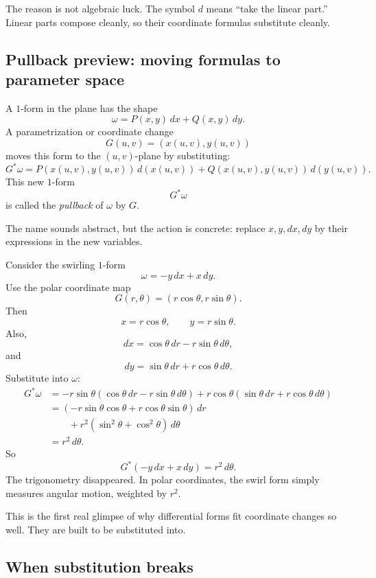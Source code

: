 The reason is not algebraic luck.  The symbol \(d\) means ``take the linear part.''
Linear parts compose cleanly, so their coordinate formulas substitute cleanly.

\subsection{Pullback preview: moving formulas to parameter space}

A \(1\)-form in the plane has the shape
\[
    \omega=P(x,y)\,dx+Q(x,y)\,dy.
\]
A parametrization or coordinate change
\[
    G(u,v)=(x(u,v),y(u,v))
\]
moves this form to the \((u,v)\)-plane by substituting:
\[
\boxed{
    G^*\omega
    =
    P(x(u,v),y(u,v))\,d(x(u,v))
    +
    Q(x(u,v),y(u,v))\,d(y(u,v)).
}
\]
This new \(1\)-form
\[
    G^*\omega
\]
is called the \emph{pullback} of \(\omega\) by \(G\).

The name sounds abstract, but the action is concrete: replace \(x,y,dx,dy\) by their
expressions in the new variables.

\begin{example}
Consider the swirling \(1\)-form
\[
    \omega=-y\,dx+x\,dy.
\]
Use the polar coordinate map
\[
    G(r,\theta)=(r\cos\theta,r\sin\theta).
\]
Then
\[
    x=r\cos\theta,
    \qquad
    y=r\sin\theta.
\]
Also,
\[
    dx=\cos\theta\,dr-r\sin\theta\,d\theta,
\]
and
\[
    dy=\sin\theta\,dr+r\cos\theta\,d\theta.
\]
Substitute into \(\omega\):
\[
\begin{aligned}
G^*\omega
&=
-r\sin\theta(\cos\theta\,dr-r\sin\theta\,d\theta)
+
r\cos\theta(\sin\theta\,dr+r\cos\theta\,d\theta)\\
&=
(-r\sin\theta\cos\theta+r\cos\theta\sin\theta)\,dr\\
&\qquad
+
r^2(\sin^2\theta+\cos^2\theta)\,d\theta\\
&=
r^2\,d\theta.
\end{aligned}
\]
So
\[
\boxed{
    G^*(-y\,dx+x\,dy)=r^2\,d\theta.
}
\]
The trigonometry disappeared.  In polar coordinates, the swirl form simply measures
angular motion, weighted by \(r^2\).
\end{example}

This is the first real glimpse of why differential forms fit coordinate changes so well.
They are built to be substituted into.

\subsection{When substitution breaks}

